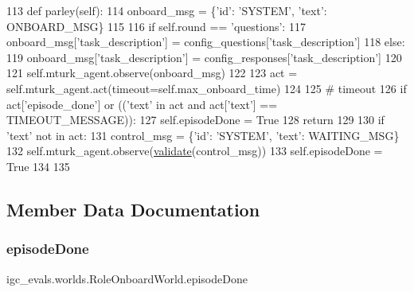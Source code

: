 \begin{DoxyCode}
113     \textcolor{keyword}{def }parley(self):
114         onboard\_msg = \{\textcolor{stringliteral}{'id'}: \textcolor{stringliteral}{'SYSTEM'}, \textcolor{stringliteral}{'text'}: ONBOARD\_MSG\}
115 
116         \textcolor{keywordflow}{if} self.round == \textcolor{stringliteral}{'questions'}:
117             onboard\_msg[\textcolor{stringliteral}{'task\_description'}] = config\_questions[\textcolor{stringliteral}{'task\_description'}]
118         \textcolor{keywordflow}{else}:
119             onboard\_msg[\textcolor{stringliteral}{'task\_description'}] = config\_responses[\textcolor{stringliteral}{'task\_description'}]
120 
121         self.mturk\_agent.observe(onboard\_msg)
122 
123         act = self.mturk\_agent.act(timeout=self.max\_onboard\_time)
124 
125         \textcolor{comment}{# timeout}
126         \textcolor{keywordflow}{if} act[\textcolor{stringliteral}{'episode\_done'}] \textcolor{keywordflow}{or} ((\textcolor{stringliteral}{'text'} \textcolor{keywordflow}{in} act \textcolor{keywordflow}{and} act[\textcolor{stringliteral}{'text'}] == TIMEOUT\_MESSAGE)):
127             self.episodeDone = \textcolor{keyword}{True}
128             \textcolor{keywordflow}{return}
129 
130         \textcolor{keywordflow}{if} \textcolor{stringliteral}{'text'} \textcolor{keywordflow}{not} \textcolor{keywordflow}{in} act:
131             control\_msg = \{\textcolor{stringliteral}{'id'}: \textcolor{stringliteral}{'SYSTEM'}, \textcolor{stringliteral}{'text'}: WAITING\_MSG\}
132             self.mturk\_agent.observe(\hyperlink{namespaceparlai_1_1core_1_1worlds_afc3fad603b7bce41dbdc9cdc04a9c794}{validate}(control\_msg))
133             self.episodeDone = \textcolor{keyword}{True}
134 
135 
\end{DoxyCode}


\subsection{Member Data Documentation}
\mbox{\label{classigc__evals_1_1worlds_1_1RoleOnboardWorld_a5746dc1a7d35c4a525c8fd2f5f20e149}} 
\subsubsection{\texorpdfstring{episode\+Done}{episodeDone}}
{\footnotesize\ttfamily igc\+\_\+evals.\+worlds.\+Role\+Onboard\+World.\+episode\+Done}



